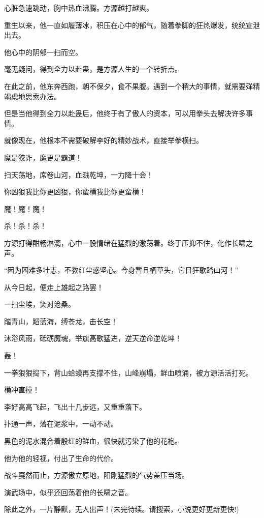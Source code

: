 \begin{this_body}
心脏急速跳动，胸中热血沸腾。方源越打越爽。

重生以来，他一直如履薄冰，积压在心中的郁气，随着拳脚的狂热爆发，统统宣泄出去。

他心中的阴郁一扫而空。

毫无疑问，得到全力以赴蛊，是方源人生的一个转折点。

在此之前，他东奔西跑，朝不保夕，食不果腹。遇到一个稍大的事情，就需要殚精竭虑地思索办法。

但是当他得到全力以赴蛊后，他终于有了傲人的资本，可以用拳头去解决许多事情。

就像现在，他根本不需要破解李好的精妙战术，直接举拳横扫。

魔是狡诈，魔更是霸道！

扫天荡地，席卷山河，血溅乾坤，一力降十会！

你凶狠我比你更凶狠，你蛮横我比你更蛮横！

魔！魔！魔！

杀！杀！杀！

方源打得酣畅淋漓，心中一股情绪在猛烈的激荡着。终于压抑不住，化作长啸之声。

“因为困难多壮志，不教红尘惑坚心。今身暂且栖草头，它日狂歌踏山河！”

从今日起，便走上雄起之路罢！

一扫尘埃，笑对沧桑。

踏青山，蹈蓝海，缚苍龙，击长空！

沐浴风雨，砥砺魔魂，举旗高歌猛进，逆天逆命逆乾坤！

轰！

一拳狠狠捣下，背山蛤蟆再支撑不住，山峰崩塌，鲜血喷涌，被方源活活打死。

横冲直撞！

李好高高飞起，飞出十几步远，又重重落下。

扑通一声，落在泥浆中，一动不动。

黑色的泥水混合着殷红的鲜血，很快就污染了他的花袍。

他为他的轻视，付出了生命的代价。

战斗戛然而止，方源傲立原地，阳刚猛烈的气势盖压当场。

演武场中，似乎还回荡着他的长啸之音。

除此之外，一片静默，无人出声！(未完待续。请搜索，小说更好更新更快!)

\end{this_body}

